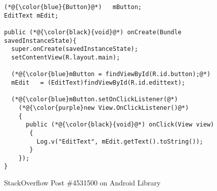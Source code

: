 \begin{figure}[t]
	\centering
\begin{lstlisting}[]
(*@{\color{blue}{Button}@*)   mButton;
EditText mEdit;

public (*@{\color{black}{void}@*) onCreate(Bundle savedInstanceState){
  super.onCreate(savedInstanceState);
  setContentView(R.layout.main);

  (*@{\color{blue}mButton = findViewById(R.id.button);@*)
  mEdit   = (EditText)findViewById(R.id.edittext);

  (*@{\color{blue}mButton.setOnClickListener(@*)
    (*@{\color{purple}new View.OnClickListener()@*)
    {
      public (*@{\color{black}{void}@*) onClick(View view)
       {
         Log.v("EditText", mEdit.getText().toString());
       }
    });
}
\end{lstlisting}
        \vspace{-12pt}
        \caption{StackOverflow Post \#4531500 on Android Library}
        \label{fig:example1}
\end{figure}

